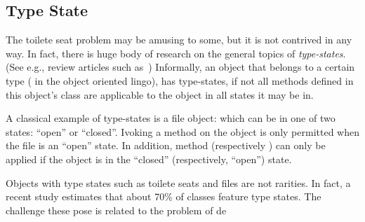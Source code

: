 \subsection{Type State}
The toilete seat problem may be amusing to some, but it is not contrived in any way.
In fact, there is huge body of research on the general topics of 
	\emph{type-states}. (See e.g., review articles such as~\cite{Tom:Jerry:2001,Ben:Jerry:1934})
Informally, an object that belongs to a certain type ( in the 
object oriented lingo), has type-states, if not all methods defined in this object's class are applicable to the object in all states it may be in.

A classical example of type-states is a file object: which can be in one of two states:
``open'' or ``closed''. Ivoking a  method on the object is only permitted when the file is an ``open'' state.
In addition, method  (respectively ) can only be applied if the object is in the ``closed'' (respectively, ``open'') state.

Objects with type states such as toilete seats and files are not rarities.
In fact, a recent study estimates that about 70\% of \Java classes feature type states.
The challenge these pose is related to the problem of de







